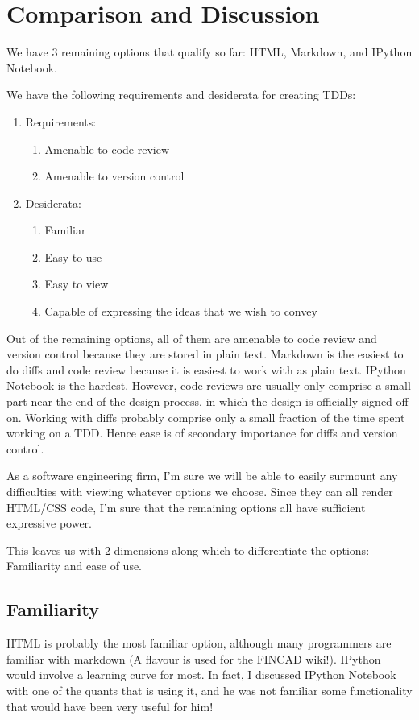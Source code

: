 \documentclass[12pt]{Report}
\begin{document}
		


\section{Comparison and Discussion}
We have 3 remaining options that qualify so far: HTML, Markdown, and IPython Notebook.

We have the following requirements and desiderata for creating TDDs:

\begin{enumerate}
	\item Requirements:
		\begin{enumerate}
			\item Amenable to code review
			\item Amenable to version control
		\end{enumerate}
	\item Desiderata:
		\begin{enumerate}
			\item Familiar
			\item Easy to use
			\item Easy to view
			\item Capable of expressing the ideas that we wish to convey			
		\end{enumerate}
\end{enumerate}

Out of the remaining options, all of them are amenable to code review and version control because they are stored in plain text.  
Markdown is the easiest to do diffs and code review because it is easiest to work with as plain text.  
IPython Notebook is the hardest.  However, code reviews are usually only comprise a small part near the end of the design process, 
in which the design is officially signed off on.  Working with diffs probably comprise only a small fraction of the time spent working on a TDD.  
Hence ease is of secondary importance for diffs and version control.

As a software engineering firm, I'm sure we will be able to easily surmount any difficulties with viewing whatever options we choose.  
Since they can all render HTML/CSS code, I'm sure that the remaining options all have sufficient expressive power.

This leaves us with 2 dimensions along which to differentiate the options: Familiarity and ease of use.


\subsection{Familiarity}
HTML is probably the most familiar option, although many programmers are familiar with markdown 
(A flavour is used for the FINCAD wiki!).  IPython would involve a learning curve for most.  In fact, I discussed 
IPython Notebook with one of the quants that is using it, and he was not familiar some functionality that 
would have been very useful for him!
\end{document}
